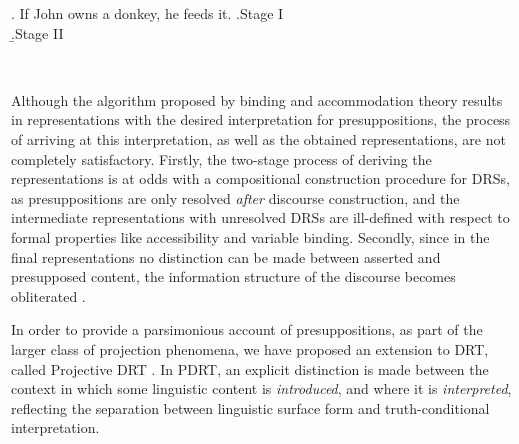 \begin{flushleft}
\begin{minipage}{0.85\linewidth}
\begin{multicols}{2}
\ex. If John owns a donkey, he feeds it.
\a.Stage I\\
  \b.\vspace*{0.1cm}Stage II\\

\end{multicols}
\end{minipage}\\
\end{flushleft}

\noindent Although the algorithm proposed by binding and accommodation
theory results in representations with the desired interpretation for
presuppositions, the process of arriving at this interpretation, as well as
the obtained representations, are not completely satisfactory. Firstly, the
two-stage process of deriving the representations is at odds with
a compositional construction procedure for DRSs, as presuppositions are only
resolved \textit{after} discourse construction, and the intermediate
representations with unresolved DRSs are ill-defined with respect to formal
properties like accessibility and variable binding. Secondly, since in the
final representations no distinction can be made between asserted and
presupposed content, the information structure of the discourse becomes
obliterated \cite{kracht1994logic,krahmer1998presupposition}.


In order to provide a parsimonious account of presuppositions, as part of
the larger class of projection phenomena, we have proposed an extension to
DRT, called Projective DRT . In PDRT,
an explicit distinction is made between the context in which some linguistic
content is \textit{introduced}, and where it is \textit{interpreted},
reflecting the separation between linguistic surface form and
truth-conditional interpretation.

